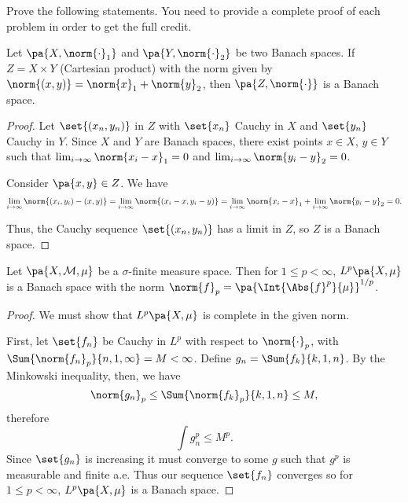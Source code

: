 \documentclass[12pt,letterpaper,twoside]{hmcpset}
\begin{document}
\noindent Prove the following statements.  You need to provide a complete proof of each problem in order to get the full credit.

\begin{problem}[1][10]
 Let $\pa{X,\norm{\cdot}_1}$ and $\pa{Y,\norm{\cdot}_2}$ be two Banach spaces. If $Z = X \times Y$ (Cartesian product) with the norm given by $\norm{(x,y)} = \norm{x}_1 + \norm{y}_2$, then $\pa{Z,\norm{\cdot}}$ is a Banach space.
\end{problem}

\begin{solution}
 \begin{proof}
  Let $\set{(x_n,y_n)}$ in $Z$ with $\set{x_n}$ Cauchy in $X$ and $\set{y_n}$ Cauchy in $Y$.  Since $X$ and $Y$ are Banach spaces, there exist points $x \in X$, $y \in Y$ such that $\lim_{i\to\infty} \norm{x_i - x}_1 = 0$ and $\lim_{i\to\infty} \norm{y_i - y}_2 = 0$.
  
  Consider $\pa{x,y} \in Z$. We have \[\lim_{i\to\infty} \norm{(x_i, y_i) - (x,y)} = \lim_{i\to\infty} \norm{(x_i - x, y_i - y)} = \lim_{i\to\infty}\norm{x_i - x}_1 + \lim_{i\to\infty} \norm{y_i - y}_2 = 0.\]
  
  Thus, the Cauchy sequence $\set{(x_n,y_n)}$ has a limit in $Z$, so $Z$ is a Banach space.
 \end{proof}
\end{solution}


\begin{problem}[2][10]
 Let $\pa{X, \mathcal{M}, \mu}$ be a $\sigma$-finite measure space.  Then for $1 \leq p < \infty$, $L^p\pa{X,\mu}$ is a Banach space with the norm $\norm{f}_p = \pa{\Int{\Abs{f}^p}{\mu}}^{1/p}$.
\end{problem}

\begin{solution}
 \begin{proof}
  We must show that $L^p\pa{X,\mu}$ is complete in the given norm.
  
  First, let $\set{f_n}$ be Cauchy in $L^p$ with respect to $\norm{\cdot}_p$, 
with $\Sum{\norm{f_n}_p}{n,1,\infty} = M < \infty$. Define $g_n = 
\Sum{f_k}{k,1,n}$. By the Minkowski inequality, then, we have 
\[\norm{g_n}_p \leq \Sum{\norm{f_k}_p}{k,1,n} \leq M,\] therefore 
\[\int g_n^p \leq M^p.\] Since $\set{g_n}$ is increasing it must converge to 
some $g$ such that $g^p$ is measurable and finite a.e. Thus our sequence 
$\set{f_n}$ converges so for $1 \leq p < \infty$, $L^p\pa{X,\mu}$ is a Banach 
space.
 \end{proof}
\end{solution}
\end{document}

